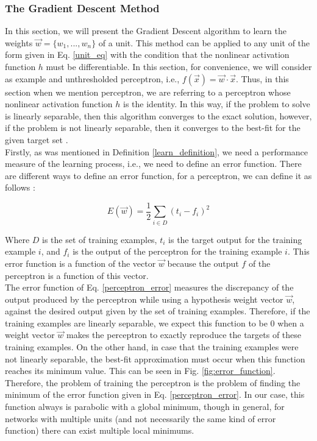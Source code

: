 \subsubsection{The Gradient Descent Method}
\label{Gradient_Descent_Method}
In this section, we will present the Gradient Descent algorithm to learn the weights $\vec{w}= \{ w_{1},...,w_{n} \}$ of a unit. This method can be applied to any unit of the form given in Eq. \ref{unit_eq} with the condition that the nonlinear activation function $h$ must be differentiable. In this section, for convenience, we will consider as example and unthresholded perceptron, i.e., $f(\vec{x})=\vec{w}\cdot \vec{x}$. Thus, in this section when we mention perceptron, we are referring to a perceptron whose nonlinear activation function $h$ is the identity. In this way, if the problem to solve is linearly separable, then this algorithm converges to the exact solution, however, if the problem is not linearly separable, then it converges to the best-fit for the given target set \cite{machine_mitchell}.\\

Firstly, as was mentioned in Definition \ref{learn_definition}, we need a performance measure of the learning process, i.e., we need to define an error function. There are different ways to define an error function, for a perceptron, we can define it as follows \cite{machine_mitchell}:

\begin{equation}
\label{perceptron_error}
	E(\vec{w})=\frac{1}{2} \sum_{i \in D} (t_{i}-f_{i})^{2}
\end{equation}

Where $D$ is the set of training examples, $t_{i}$ is the target output for the training example $i$, and $f_{i}$ is the output of the perceptron for the training example $i$. This error function is a function of the vector $\vec{w}$ because the output $f$ of the perceptron is a function of this vector.\\

The error function of Eq. \ref{perceptron_error} measures the discrepancy of the output produced by the perceptron while using a hypothesis weight vector $\vec{w}$, against the desired output given by the set of training examples. Therefore, if the training examples are linearly separable, we expect this function to be $0$ when a weight vector $\vec{w}$ makes the perceptron to exactly reproduce the targets of these training examples. On the other hand, in case that the training examples were not linearly separable, the best-fit approximation must occur when this function reaches its minimum value. This can be seen in Fig. \ref{fig:error_function}. Therefore, the problem of training the perceptron is the problem of finding the minimum of the error function given in Eq. \ref{perceptron_error}. In our case, this function always is parabolic with a global minimum, though in general, for networks with multiple units (and not necessarily the same kind of error function) there can exist multiple local minimums.\\

